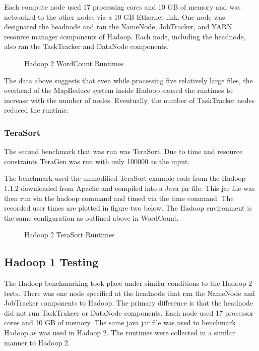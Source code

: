 \documentclass[conference]{IEEEtran}
\begin{document}
		Each compute node used 17 processing cores and 10 GB of memory and was networked to the other nodes via a 10 GB Ethernet link. One node was designated the headnode and ran the NameNode, JobTracker, and YARN resource manager components of Hadoop. Each node, including the headnode, also ran the TaskTracker and DataNode components.

                  				\begin{figure}[h]
                    					\begin{center}
                        						
                        						\caption{Hadoop 2 WordCount Runtimes}
                    					\end{center}
                  				\end{figure}
		
		The data above suggests that even while processing five relatively large files, the overhead of the MapReduce system inside Hadoop caused the runtimes to increase with the number of nodes. Eventually, the number of TaskTracker nodes reduced the runtime.


				\subsubsection{TeraSort}
					The second benchmark that was run was TeraSort. Due to time and resource constraints TeraGen was run with only 100000 as the input.

					The benchmark used the unmodified TeraSort example code from the Hadoop 1.1.2 downloaded from Apache and compiled into a Java jar file. This jar file was then run via the hadoop command and timed via the time command. The recorded user times are plotted in figure two below. The Hadoop environment is the same configuration as outlined above in WordCount.
					\begin{figure}[h]
                   				\begin{center}
                       					
                        					\caption{Hadoop 2 TeraSort Runtimes}
                    				\end{center}
                  			\end{figure}
				\subsection{Hadoop 1 Testing}
					The Hadoop benchmarking took place under similar conditions to the Hadoop 2 tests. There was one node specified at the headnode that ran the NameNode and JobTracker components to Hadoop. The primary difference is that the headnode did not run TaskTrakcer or DataNode components. Each node used 17 processor cores and 10 GB of memory. The same java jar file was used to benchmark Hadoop as was used in Hadoop 2. The runtimes were collected in a similar manner to Hadoop 2.
\end{document}
